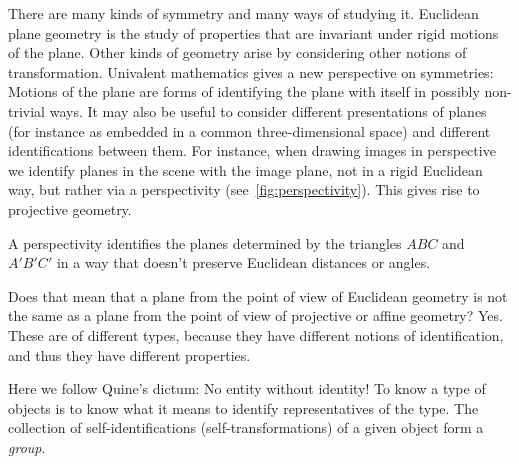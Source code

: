 There are many kinds of symmetry and many ways of studying it.
Euclidean plane geometry is the study of properties that are invariant under rigid motions of the plane.
Other kinds of geometry arise by considering other notions of transformation.
Univalent mathematics gives a new perspective on symmetries:
Motions of the plane are forms of identifying the plane with itself in possibly non-trivial ways.
It may also be useful to consider different presentations of planes
(for instance as embedded in a common three-dimensional space)
and different identifications between them.
For instance, when drawing images in perspective
we identify planes in the scene with the image plane,
not in a rigid Euclidean way, but
rather via a perspectivity (see~\cref{fig:perspectivity}).
This gives rise to projective geometry.
\begin{marginfigure}
  \begin{center}
    \footnotesize
  \end{center}
  \caption{A perspectivity identifies the planes determined by the triangles $ABC$ and $A'B'C'$ in a way that doesn't preserve Euclidean distances or angles.}
  \label{fig:perspectivity}
\end{marginfigure}

Does that mean that a plane from the point of view of Euclidean
geometry is not the same as a plane from the point of view of
projective or affine geometry?
Yes.
These are of different types,
because they have different notions of identification,
and thus they have different properties.

Here we follow Quine's dictum: No entity without identity!
To know a type of objects is to know what it means to identify representatives of the type.
The collection of self-identifications (self-transformations) of a given object form a \emph{group}.

